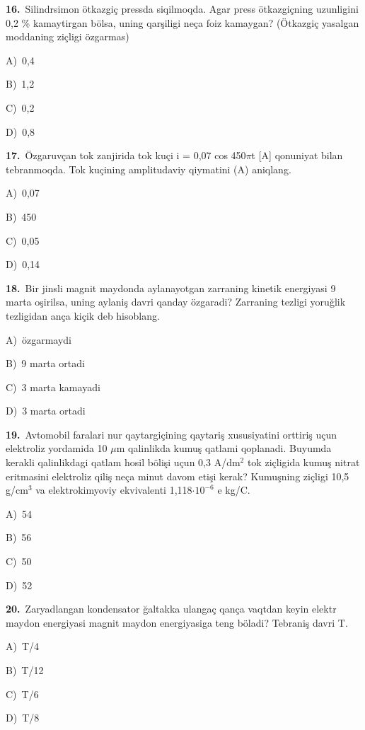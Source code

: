 \documentclass[11pt,a4paper]{article}
\newcommand{\opt}[2]{\hspace*{4mm}#1)\ #2\par}
\begin{document}
\noindent\begin{minipage}{\linewidth}
\textbf{16.}\ Silindrsimon ötkazgiç pressda siqilmoqda. Agar press ötkazgiçning uzunligini 0,2 \% kamaytirgan bölsa, uning qarşiligi neça foiz kamaygan? (Ötkazgiç yasalgan moddaning ziçligi özgarmas)\par\smallskip
\opt{A}{0,4}
\opt{B}{1,2}
\opt{C}{0,2}
\opt{D}{0,8}
\end{minipage}\vspace{9pt}\par
\noindent\begin{minipage}{\linewidth}
\textbf{17.}\ Özgaruvçan tok zanjirida tok kuçi i = 0,07 cos 450$\pi$t [A] qonuniyat bilan tebranmoqda. Tok kuçining amplitudaviy qiymatini (A) aniqlang.\par\smallskip
\opt{A}{0,07}
\opt{B}{450}
\opt{C}{0,05}
\opt{D}{0,14}
\end{minipage}\vspace{9pt}\par
\noindent\begin{minipage}{\linewidth}
\textbf{18.}\ Bir jinsli magnit maydonda aylanayotgan zarraning kinetik energiyasi 9 marta oşirilsa, uning aylaniş davri qanday özgaradi? Zarraning tezligi yoruğlik tezligidan ança kiçik deb hisoblang.\par\smallskip
\opt{A}{özgarmaydi}
\opt{B}{9 marta ortadi}
\opt{C}{3 marta kamayadi}
\opt{D}{3 marta ortadi}
\end{minipage}\vspace{9pt}\par
\noindent\begin{minipage}{\linewidth}
\textbf{19.}\ Avtomobil faralari nur qaytargiçining qaytariş xususiyatini orttiriş uçun elektroliz yordamida 10 $\mu$m qalinlikda kumuş qatlami qoplanadi. Buyumda kerakli qalinlikdagi qatlam hosil bölişi uçun 0,3 A/dm$^{2}$ tok ziçligida kumuş nitrat eritmasini elektroliz qiliş neça minut davom etişi kerak? Kumuşning ziçligi 10,5 g/cm$^{3}$ va elektrokimyoviy ekvivalenti 1,118$\cdot10^{-6}$ e kg/C.\par\smallskip
\opt{A}{54}
\opt{B}{56}
\opt{C}{50}
\opt{D}{52}
\end{minipage}\vspace{9pt}\par
\noindent\begin{minipage}{\linewidth}
\textbf{20.}\ Zaryadlangan kondensator ğaltakka ulangaç qança vaqtdan keyin elektr maydon energiyasi magnit maydon energiyasiga teng böladi? Tebraniş davri T.\par\smallskip
\opt{A}{T/4}
\opt{B}{T/12}
\opt{C}{T/6}
\opt{D}{T/8}
\end{minipage}\vspace{9pt}\par
\end{document}
